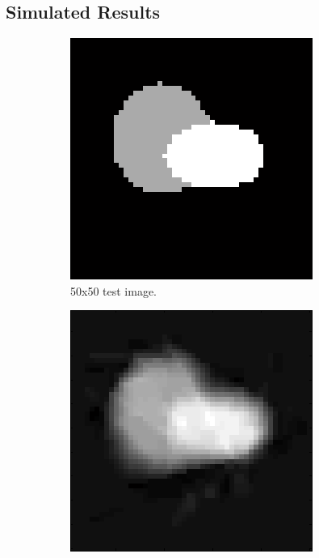 \documentclass[english]{article}\usepackage[]{graphicx}\usepackage[]{color}
\begin{document}
\subsection{Simulated Results}

\begin{figure}[h]
\centering
\begin{subfigure}{.22\textwidth}
  \centering
    \includegraphics[width=1\linewidth]{figures/simulatedresultoriginal}
  \caption{50x50 test image.}
  \vspace{20pt}
  \label{fig:simulresorig}
\end{subfigure}%
\hspace{10pt}
\begin{subfigure}{.22\textwidth}
  \centering
    \includegraphics[width=1\linewidth]{figures/simulatedresultrec}

\end{subfigure}
\end{figure}
\end{document}
